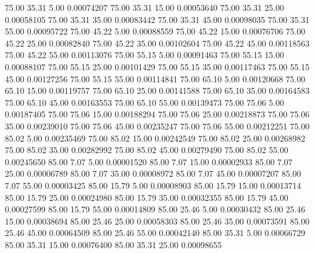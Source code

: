      75.00     35.31      5.00     0.00074207
     75.00     35.31     15.00     0.00053640
     75.00     35.31     25.00     0.00058105
     75.00     35.31     35.00     0.00083442
     75.00     35.31     45.00     0.00098035
     75.00     35.31     55.00     0.00095722
     75.00     45.22      5.00     0.00088559
     75.00     45.22     15.00     0.00076706
     75.00     45.22     25.00     0.00082840
     75.00     45.22     35.00     0.00102604
     75.00     45.22     45.00     0.00118563
     75.00     45.22     55.00     0.00113076
     75.00     55.15      5.00     0.00091463
     75.00     55.15     15.00     0.00088107
     75.00     55.15     25.00     0.00101429
     75.00     55.15     35.00     0.00117463
     75.00     55.15     45.00     0.00127256
     75.00     55.15     55.00     0.00114841
     75.00     65.10      5.00     0.00120668
     75.00     65.10     15.00     0.00119757
     75.00     65.10     25.00     0.00141588
     75.00     65.10     35.00     0.00164583
     75.00     65.10     45.00     0.00163553
     75.00     65.10     55.00     0.00139473
     75.00     75.06      5.00     0.00187405
     75.00     75.06     15.00     0.00188294
     75.00     75.06     25.00     0.00218873
     75.00     75.06     35.00     0.00239010
     75.00     75.06     45.00     0.00235247
     75.00     75.06     55.00     0.00212251
     75.00     85.02      5.00     0.00235469
     75.00     85.02     15.00     0.00242549
     75.00     85.02     25.00     0.00268982
     75.00     85.02     35.00     0.00282992
     75.00     85.02     45.00     0.00279490
     75.00     85.02     55.00     0.00245650
     85.00      7.07      5.00     0.00001520
     85.00      7.07     15.00     0.00002933
     85.00      7.07     25.00     0.00006789
     85.00      7.07     35.00     0.00008972
     85.00      7.07     45.00     0.00007207
     85.00      7.07     55.00     0.00003425
     85.00     15.79      5.00     0.00008903
     85.00     15.79     15.00     0.00013714
     85.00     15.79     25.00     0.00024980
     85.00     15.79     35.00     0.00032355
     85.00     15.79     45.00     0.00027599
     85.00     15.79     55.00     0.00014809
     85.00     25.46      5.00     0.00030432
     85.00     25.46     15.00     0.00038694
     85.00     25.46     25.00     0.00058303
     85.00     25.46     35.00     0.00073591
     85.00     25.46     45.00     0.00064509
     85.00     25.46     55.00     0.00042140
     85.00     35.31      5.00     0.00066729
     85.00     35.31     15.00     0.00076400
     85.00     35.31     25.00     0.00098655
